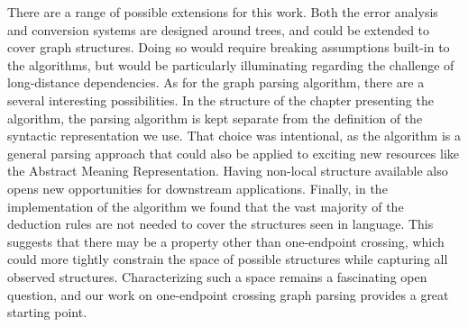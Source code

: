 There are a range of possible extensions for this work.
Both the error analysis and conversion systems are designed around trees, and could be extended to cover graph structures.
Doing so would require breaking assumptions built-in to the algorithms, but would be particularly illuminating regarding the challenge of long-distance dependencies.
As for the graph parsing algorithm, there are a several interesting possibilities.
In the structure of the chapter presenting the algorithm, the parsing algorithm is kept separate from the definition of the syntactic representation we use.
That choice was intentional, as the algorithm is a general parsing approach that could also be applied to exciting new resources like the Abstract Meaning Representation.
Having non-local structure available also opens new opportunities for downstream applications.
Finally, in the implementation of the algorithm we found that the vast majority of the deduction rules are not needed to cover the structures seen in language.
This suggests that there may be a property other than one-endpoint crossing, which could more tightly constrain the space of possible structures while capturing all observed structures.
Characterizing such a space remains a fascinating open question, and our work on one-endpoint crossing graph parsing provides a great starting point.

